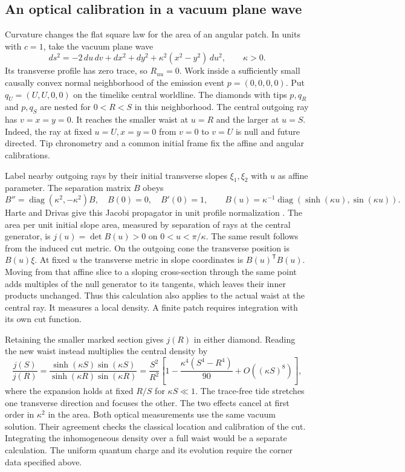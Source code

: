 \documentclass[11pt,letterpaper]{article}
\begin{document}
\subsection{An optical calibration in a vacuum plane wave}
\label{sec:plane-calibration}

Curvature changes the flat square law for the area of an angular patch. In units with \(c=1\), take the vacuum plane wave
\[
 ds^2=-2\,du\,dv+dx^2+dy^2+\kappa^2(x^2-y^2)\,du^2,\qquad \kappa>0.
\]
Its transverse profile has zero trace, so \(R_{uu}=0\). Work inside a sufficiently small causally convex normal neighborhood of the emission event \(p=(0,0,0,0)\). Put \(q_U=(U,U,0,0)\) on the timelike central worldline. The diamonds with tips \(p,q_R\) and \(p,q_S\) are nested for \(0<R<S\) in this neighborhood. The central outgoing ray has \(v=x=y=0\). It reaches the smaller waist at \(u=R\) and the larger at \(u=S\). Indeed, the ray at fixed \(u=U,x=y=0\) from \(v=0\) to \(v=U\) is null and future directed. Tip chronometry and a common initial frame fix the affine and angular calibrations.

Label nearby outgoing rays by their initial transverse slopes \(\xi_1,\xi_2\) with \(u\) as affine parameter. The separation matrix \(B\) obeys
\[
 B''=\operatorname{diag}(\kappa^2,-\kappa^2)B,\quad
 B(0)=0,\quad B'(0)=1,\qquad
 B(u)=\kappa^{-1}\operatorname{diag}(\sinh(\kappa u),\sin(\kappa u)).
\]
Harte and Drivas give this Jacobi propagator in unit profile normalization \cite[Eqs.~(3.90)--(3.93)]{harte-drivas}. The area per unit initial slope area, measured by separation of rays at the central generator, is \(j(u)=\det B(u)>0\) on \(0<u<\pi/\kappa\). The same result follows from the induced cut metric. On the outgoing cone the transverse position is \(B(u)\xi\). At fixed \(u\) the transverse metric in slope coordinates is \(B(u)^{\mathsf T}B(u)\). Moving from that affine slice to a sloping cross-section through the same point adds multiples of the null generator to its tangents, which leaves their inner products unchanged. Thus this calculation also applies to the actual waist at the central ray. It measures a local density. A finite patch requires integration with its own cut function.

Retaining the smaller marked section gives \(j(R)\) in either diamond. Reading the new waist instead multiplies the central density by
\[
 \frac{j(S)}{j(R)}
 =\frac{\sinh(\kappa S)\sin(\kappa S)}{\sinh(\kappa R)\sin(\kappa R)}
 =\frac{S^2}{R^2}\left[1-\frac{\kappa^4(S^4-R^4)}{90}
       +O((\kappa S)^8)\right],
\]
where the expansion holds at fixed \(R/S\) for \(\kappa S\ll 1\). The trace-free tide stretches one transverse direction and focuses the other. The two effects cancel at first order in \(\kappa^2\) in the area. Both optical measurements use the same vacuum solution. Their agreement checks the classical location and calibration of the cut. Integrating the inhomogeneous density over a full waist would be a separate calculation. The uniform quantum charge and its evolution require the corner data specified above.
\end{document}
